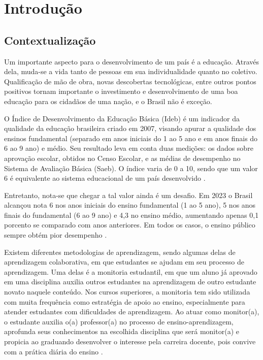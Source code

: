 \chapter[Introdução]{Introdução}
\label{cap:introducao}

\section[Contextualização]{Contextualização}
\label{sec:contextualizacao}

Um importante aspecto para o desenvolvimento de um país é a educação. Através dela, muda-se a vida tanto de pessoas em sua individualidade quanto no coletivo. Qualificação de mão de obra, novas descobertas tecnológicas, entre outros pontos positivos tornam importante o investimento e desenvolvimento de uma boa educação para os cidadãos de uma nação, e o Brasil não é exceção.

O Índice de Desenvolvimento da Educação Básica (Ideb) é um indicador da qualidade da educação brasileira criado em 2007, visando apurar a qualidade dos ensinos fundamental (separado em anos iniciais do 1\textordmasculine{} ao 5\textordmasculine{} ano e em anos finais do 6\textordmasculine{} ao 9\textordmasculine{} ano) e médio. Seu resultado leva em conta duas medições: os dados sobre aprovação escolar, obtidos no Censo Escolar, e as médias de desempenho no Sistema de Avaliação Básica (Saeb). O índice varia de 0 a 10, sendo que um valor 6 é equivalente ao sistema educacional de um país desenvolvido \cite{inep2024indicador}.

Entretanto, nota-se que chegar a tal valor ainda é um desafio. Em 2023 o Brasil alcançou nota 6 nos anos iniciais do ensino fundamental (1\textordmasculine{} ao 5\textordmasculine{} ano), 5 nos anos finais do fundamental (6\textordmasculine{} ao 9\textordmasculine{} ano) e 4,3 no ensino médio, aumentando apenas 0,1 porcento se comparado com anos anteriores. Em todos os casos, o ensino público sempre obtém pior desempenho \cite{ferreira2024educacao}. 

Existem diferentes metodologias de aprendizagem, sendo algumas delas de aprendizagem colaborativa, em que estudantes se ajudam em seu processo de aprendizagem. Uma delas é a monitoria estudantil, em que um aluno já aprovado em uma disciplina auxilia outros estudantes na aprendizagem de outro estudante novato naquele conteúdo. Nos cursos superiores, a monitoria tem sido utilizada com muita frequência como estratégia de apoio ao ensino, especialmente para atender estudantes com dificuldades de aprendizagem. Ao atuar como monitor(a), o estudante auxilia o(a) professor(a) no processo de ensino-aprendizagem, aprofunda seus conhecimentos na escolhida disciplina que será monitor(a) e propicia ao graduando desenvolver o interesse pela carreira docente, pois convive com a prática diária do ensino \cite{gonccalves2021importancia}.

